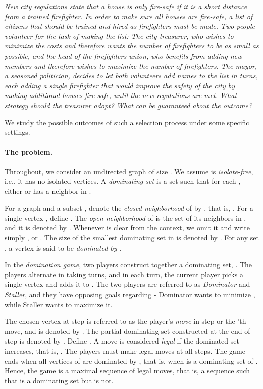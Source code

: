 \documentclass[11pt]{article}
\theoremstyle{definition}
\begin{document}
{\em New city regulations state that a house is only fire-safe if it is a short distance from a trained firefighter.
In order to make sure all houses are fire-safe, a list of citizens that should be trained and hired as firefighters must be made.
Two people volunteer for the task of making the list:
The city treasurer, who wishes to minimize the costs and therefore wants the number of firefighters to be as small as possible,
and 
the head of the firefighters union, who benefits from adding new members and therefore wishes to maximize the number of firefighters.
The mayor, a seasoned politician, decides to let both volunteers add names to the list 
in turns, each adding a single firefighter that would improve the safety of the city by making additional houses fire-safe, until the new regulations are met.
What strategy should the treasurer adopt? What can be guaranteed about the outcome?
}

We study the possible outcomes of such a selection process under some specific settings.

\paragraph{The problem.}
Throughout, we consider an undirected graph  of size .
We assume  is \emph{isolate-free}, i.e., it has no isolated vertices.
A \emph{dominating set} is a set  such that for each , either  or  has a neighbor in .

For a graph  and a subset , denote the \emph{closed neighborhood} of  by , that is,
. 
For a single vertex , define 
.
The \emph{open neighborhood} of  is the set of its neighbors in , and it is denoted by .
Whenever  is clear from the context, we omit it and write simply ,  or .
The size of the smallest dominating set in  is denoted by .
For any set , a vertex  is said to be \emph{dominated by }.

In the \emph{domination game}, two players construct together a dominating set, . 
The players alternate in taking turns, and in each turn, the current player picks a single vertex and adds it to .
The two players are referred to as \emph{Dominator} and \emph{Staller}, and they have opposing goals regarding  - Dominator wants to minimize , while Staller wants to maximize it.

The chosen vertex at step  is referred to as the player's \emph{move} in step  or the 'th move, and is denoted by .
The partial dominating set constructed at the end of step  is denoted by . Define .
A move  is considered \emph{legal} if the dominated set increases, that is, .
The players must make legal moves at all steps. 
The game ends when all vertices of  are dominated by , that is, when  is a dominating set of .
Hence, the game is a maximal sequence of legal moves, that is, a sequence  such that  is a dominating set but  is not.
\end{document}
